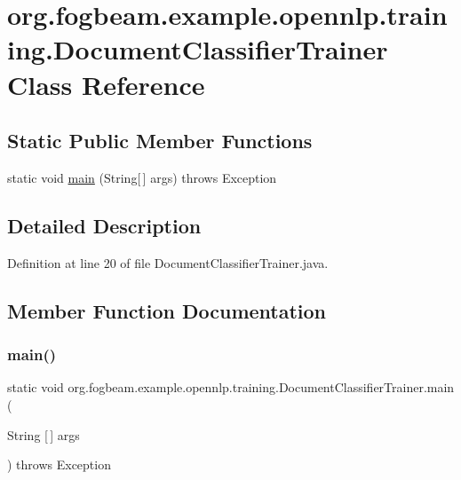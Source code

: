 \hypertarget{classorg_1_1fogbeam_1_1example_1_1opennlp_1_1training_1_1_document_classifier_trainer}{}\section{org.\+fogbeam.\+example.\+opennlp.\+training.\+Document\+Classifier\+Trainer Class Reference}
\label{classorg_1_1fogbeam_1_1example_1_1opennlp_1_1training_1_1_document_classifier_trainer}
\subsection*{Static Public Member Functions}
\begin{DoxyCompactItemize}
\item 
static void \hyperlink{classorg_1_1fogbeam_1_1example_1_1opennlp_1_1training_1_1_document_classifier_trainer_ad740f4a3bd9a068afd18c2be85deba75}{main} (String\mbox{[}$\,$\mbox{]} args)  throws Exception 	
\end{DoxyCompactItemize}


\subsection{Detailed Description}


Definition at line 20 of file Document\+Classifier\+Trainer.\+java.



\subsection{Member Function Documentation}
\hypertarget{classorg_1_1fogbeam_1_1example_1_1opennlp_1_1training_1_1_document_classifier_trainer_ad740f4a3bd9a068afd18c2be85deba75}{}\label{classorg_1_1fogbeam_1_1example_1_1opennlp_1_1training_1_1_document_classifier_trainer_ad740f4a3bd9a068afd18c2be85deba75} 
\subsubsection{\texorpdfstring{main()}{main()}}
{\footnotesize\ttfamily static void org.\+fogbeam.\+example.\+opennlp.\+training.\+Document\+Classifier\+Trainer.\+main (\begin{DoxyParamCaption}\item[{String \mbox{[}$\,$\mbox{]}}]{args }\end{DoxyParamCaption}) throws Exception\hspace{0.3cm}{\ttfamily [static]}}



